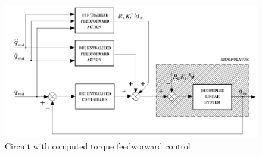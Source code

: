 \begin{figure}[H]
	\centering
	\includegraphics[width=0.7\linewidth]{images/computed_torque}
	\caption{Circuit with computed torque feedworward control}
	\label{fig:computedtorque}
\end{figure}


